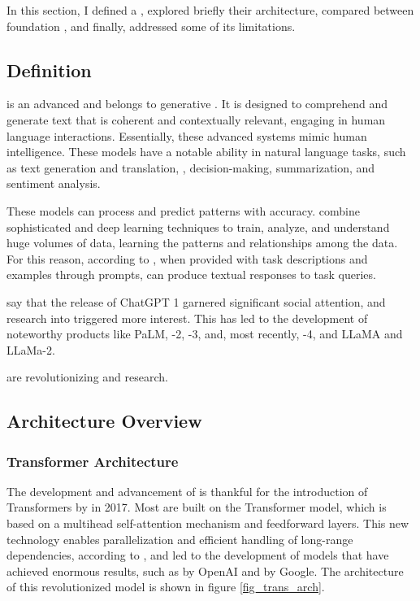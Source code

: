In this section, I defined a {\llm}, explored briefly their architecture, compared between foundation {\llm}, and finally, addressed some of its limitations.


\subsection{Definition}

{\llm} is an advanced {\lm} and belongs to generative {\ai}. It is designed to comprehend and generate text that is coherent and contextually relevant, engaging in human language interactions. Essentially, these advanced {\ai} systems mimic human intelligence. These models have a notable ability in natural language tasks, such as text generation and translation, {\qa}, decision-making, summarization, and sentiment analysis.

These models can process and predict patterns with accuracy. \citet{hadi_LLM_2023} combine sophisticated {\slm} and deep learning techniques to train, analyze, and understand huge volumes of data, learning the patterns and relationships among the data. For this reason, according to \citet{naveed_comprehensive_2023}, when provided with task descriptions and examples through prompts, {\llm} can produce textual responses to task queries. 

\citet{liu_prompting_nodate} say that the release of ChatGPT 1 garnered significant social attention, and research into {\llm} triggered more interest. This has led to the development of noteworthy products like PaLM, {\gpt}-2, {\gpt}-3, and, most recently, {\gpt}-4, and LLaMA and LLaMa-2.

{\llm} are revolutionizing {\nlp} and {\ai} research.


\subsection{Architecture Overview}

\subsubsection{Transformer Architecture}

The development and advancement of {\llm} is thankful for the introduction of Transformers by \citet{vaswani_attention_2023} in 2017. Most {\llm} are built on the Transformer model, which is based on a multihead self-attention mechanism and feedforward layers. This new technology enables parallelization and efficient handling of long-range dependencies, according to \citet{hadi_LLM_2023}, and led to the development of models that have achieved enormous results, such as {\gpt} by OpenAI and {\bert} by Google. The architecture of this revolutionized model is shown in figure \ref{fig_trans_arch}.

